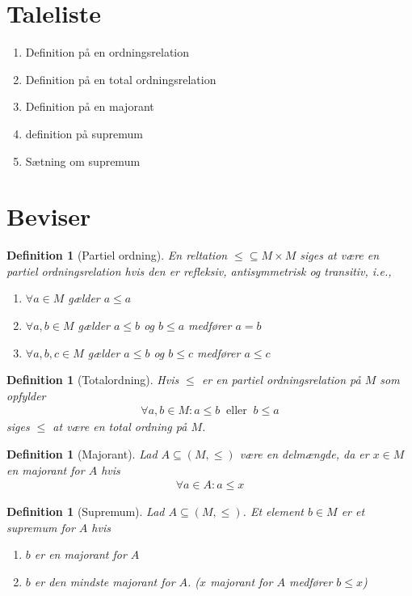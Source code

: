 \documentclass[10pt,twoside,openany,final]{memoir}
\theoremstyle{break}
\newtheorem{definition}[section]{Definition}
\theoremstyle{Break}
\begin{document}
\section*{Taleliste}
\begin{enumerate}
\item Definition på en ordningsrelation
\item Definition på en total ordningsrelation
\item Definition på en majorant
\item definition på supremum
\item Sætning om supremum
\end{enumerate}

\section*{Beviser}
\begin{definition}[Partiel ordning]
En reltation $\leq \subseteq M \times M$ siges at være en partiel ordningsrelation hvis den er refleksiv, antisymmetrisk og transitiv, i.e., 
\begin{enumerate}
\item $\forall a \in M$ gælder $a \leq a$
\item $\forall a,b \in M$ gælder $a \leq b$ og $b \leq a$ medfører $a=b$
\item $\forall a,b,c \in M$ gælder $a \leq b$ og $b \leq c$ medfører $a \leq c$
\end{enumerate}
\end{definition}

\begin{definition}[Totalordning]
Hvis $\leq$ er en partiel ordningsrelation på $M$ som opfylder 
\begin{align*}
\forall a,b \in M \colon a \leq b \ \text{ eller } \ b \leq a
\end{align*}
siges $\leq$ at være en total ordning på $M$.
\end{definition}

\begin{definition}[Majorant]
Lad $A \subseteq (M,\leq)$ være en delmængde, da er $x \in M$ en majorant for $A$ hvis
\begin{align*}
\forall a \in A \colon a \leq x
\end{align*}
\end{definition}

\begin{definition}[Supremum]
Lad $A \subseteq(M,\leq)$. Et element $b \in M$ er et supremum for $A$ hvis
\begin{enumerate}
\item $b$ er en majorant for $A$
\item $b$ er den mindste majorant for $A$. ($x$ majorant for $A$ medfører $b \leq x$)
\end{enumerate}
\end{definition}
\end{document}
